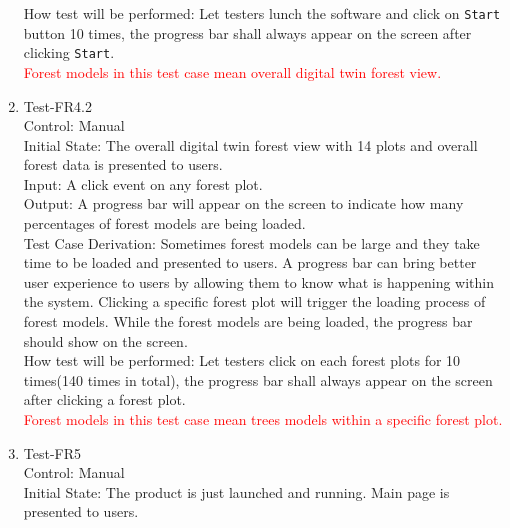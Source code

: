 \documentclass[12pt, titlepage]{article}
\begin{document}
\begin{enumerate}
How test will be performed: Let testers lunch the software and click on 
\verb|Start| button 10 times, the progress bar 
shall always appear on the screen after clicking
\verb|Start|.\\

\textcolor{red}{Forest models in this test case mean overall 
digital twin forest view.}

\item{Test-FR4.2\\}
Control: Manual\\ 

Initial State: The overall digital twin forest view with 14 plots 
and overall forest data is presented to users.\\

Input: A click event on any forest plot.\\

Output: A progress bar will appear on the screen to indicate how many
percentages of forest models are being loaded.\\

Test Case Derivation: Sometimes forest models can be large and they take
time to be loaded and presented to users. A progress bar can bring better
user experience to users by allowing them to know what is happening within the 
system. Clicking a specific forest plot will trigger the loading process of 
forest models. While the forest models are being loaded, the progress bar 
should show on the screen.\\
					
How test will be performed: Let testers click on each forest plots for 10 times(140 
times in total), the progress bar shall always appear on the screen after clicking
a forest plot.\\

\textcolor{red}{Forest models in this test case mean trees 
models within a specific forest plot.}

\item{Test-FR5\\}
Control: Manual\\ 

Initial State: The product is just launched and running. Main page
is presented to users.\\


\end{enumerate}
\end{document}
